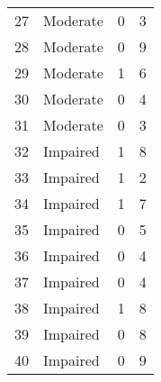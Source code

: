 \begin{tabular}{rlrr}
      27 &          Moderate &    0 &            3 \\
      28 &          Moderate &    0 &            9 \\
      29 &          Moderate &    1 &            6 \\
      30 &          Moderate &    0 &            4 \\
      31 &          Moderate &    0 &            3 \\
      32 &          Impaired &    1 &            8 \\
      33 &          Impaired &    1 &            2 \\
      34 &          Impaired &    1 &            7 \\
      35 &          Impaired &    0 &            5 \\
      36 &          Impaired &    0 &            4 \\
      37 &          Impaired &    0 &            4 \\
      38 &          Impaired &    1 &            8 \\
      39 &          Impaired &    0 &            8 \\
      40 &          Impaired &    0 &            9 \\
\bottomrule
\end{tabular}
